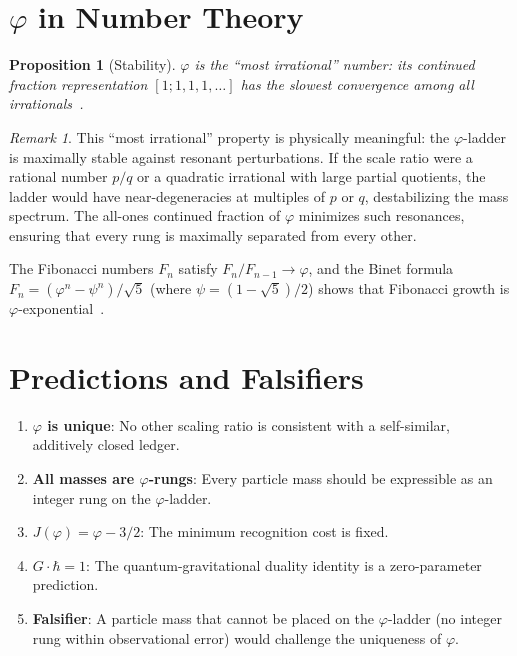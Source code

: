 \documentclass[12pt,a4paper]{article}
\newtheorem{proposition}[theorem]{Proposition}
\theoremstyle{definition}
\theoremstyle{remark}
\newtheorem{remark}[theorem]{Remark}
\begin{document}
\section{$\varphi$ in Number Theory}
\label{sec:number-theory}

\begin{proposition}[Stability]
\label{prop:stability}
$\varphi$ is the ``most irrational'' number: its continued
fraction representation $[1; 1, 1, 1, \ldots]$ has the slowest
convergence among all irrationals~\cite{Hardy1979}.
\end{proposition}

\begin{remark}
This ``most irrational'' property is physically meaningful:
the $\varphi$-ladder is maximally stable against resonant
perturbations.  If the scale ratio were a rational number $p/q$
or a quadratic irrational with large partial quotients, the
ladder would have near-degeneracies at multiples of $p$ or $q$,
destabilizing the mass spectrum.  The all-ones continued fraction
of $\varphi$ minimizes such resonances, ensuring that every
rung is maximally separated from every other.

The Fibonacci numbers $F_n$ satisfy $F_n/F_{n-1} \to \varphi$,
and the Binet formula
$F_n = (\varphi^n - \psi^n)/\sqrt{5}$ (where
$\psi = (1-\sqrt{5})/2$) shows that Fibonacci growth is
$\varphi$-exponential~\cite{Livio2002}.
\end{remark}

\section{Predictions and Falsifiers}
\label{sec:predictions}

\begin{enumerate}
  \item \textbf{$\varphi$ is unique}: No other scaling ratio is
  consistent with a self-similar, additively closed ledger.

  \item \textbf{All masses are $\varphi$-rungs}: Every particle
  mass should be expressible as an integer rung on the
  $\varphi$-ladder.

  \item \textbf{$J(\varphi) = \varphi - 3/2$}: The minimum
  recognition cost is fixed.

  \item \textbf{$G \cdot \hbar = 1$}: The quantum-gravitational
  duality identity is a zero-parameter prediction.

  \item \textbf{Falsifier}: A particle mass that cannot be
  placed on the $\varphi$-ladder (no integer rung within
  observational error) would challenge the uniqueness of
  $\varphi$.
\end{enumerate}
\end{document}
